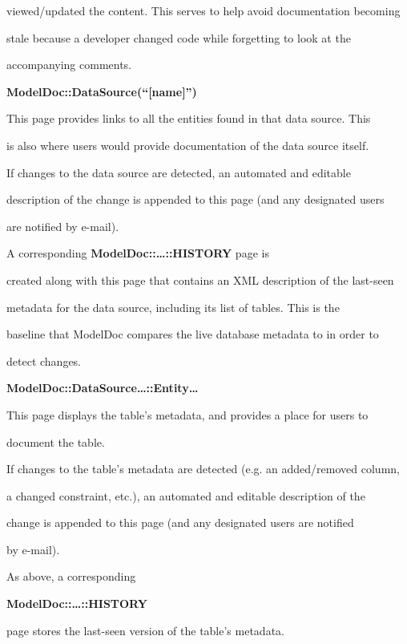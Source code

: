 \documentclass{acm_proc_article-sp}
\begin{document}
viewed/updated the content.  This serves to help avoid documentation becoming

stale because a developer changed code while forgetting to look at the

accompanying comments.



\textbf{ModelDoc::DataSource(``[name]'')}

This page provides links to all the entities found in that data source.  This

is also where users would provide documentation of the data source itself.



If changes to the data source are detected, an automated and editable

description of the change is appended to this page (and any designated users

are notified by e-mail).



A corresponding \textbf{ModelDoc::\ldots::HISTORY} page is

created along with this page that contains an XML description of the last-seen

metadata for the data source, including its list of tables.  This is the

baseline that ModelDoc compares the live database metadata to in order to 

detect changes.



\textbf{ModelDoc::DataSource\ldots::Entity\ldots}

This page displays the table's metadata, and provides a place for users to

document the table.



If changes to the table's metadata are detected (e.g. an added/removed column,

a changed constraint, etc.), an automated and editable description of the

change is appended to this page (and any designated users are notified

by e-mail).



As above, a corresponding

\textbf{ModelDoc::\ldots::HISTORY}

page stores the last-seen version of the table's metadata.
\end{document}
